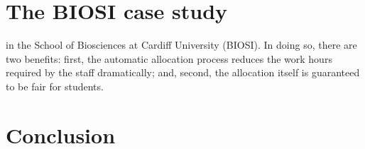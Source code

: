 \section{The BIOSI case study}\label{sec:biosi}

in the School of Biosciences at Cardiff University (BIOSI). In doing
so, there are two benefits: first, the automatic allocation process reduces the
work hours required by the staff dramatically; and, second, the allocation
itself is guaranteed to be fair for students.


\section{Conclusion}\label{sec:conclusion}
